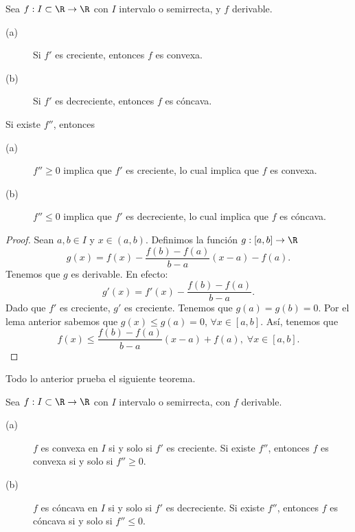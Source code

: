 \begin{fprop}[]
\normalfont Sea $\displaystyle f : I \subset \R \to \R $ con $\displaystyle I $ intervalo o semirrecta, y $\displaystyle f $ derivable. 
\begin{description}
\item[(a)] Si $\displaystyle f' $ es creciente, entonces $\displaystyle f $ es convexa.
\item[(b)] Si $\displaystyle f' $ es decreciente, entonces $\displaystyle f $ es cóncava.
\end{description}
\end{fprop}
\begin{observation}
\normalfont Si existe $\displaystyle f'' $, entonces 
\begin{description}
\item[(a)] $\displaystyle f'' \geq 0  $ implica que $\displaystyle f' $ es creciente, lo cual implica que $\displaystyle f $ es convexa.
\item[(b)] $\displaystyle f'' \leq 0 $ implica que $\displaystyle f' $ es decreciente, lo cual implica que $\displaystyle f $ es cóncava.
\end{description}
\end{observation}
\begin{proof}
	Sean $\displaystyle a,b \in I $ y $\displaystyle x \in \left(a,b\right) $. Definimos la función $\displaystyle g : [a,b] \to \R $  
\[ g\left(x\right) = f\left(x\right)-\frac{f\left(b\right)-f\left(a\right)}{b-a}\left(x-a\right)-f\left(a\right) .\]
Tenemos que $\displaystyle g $ es derivable. En efecto:
\[g'\left(x\right) = f'\left(x\right)-\frac{f\left(b\right)-f\left(a\right)}{b-a} .\]
Dado que $\displaystyle f' $ es creciente, $\displaystyle g' $ es creciente. Tenemos que $\displaystyle g\left(a\right) = g\left(b\right) = 0 $. Por el lema anterior sabemos que $\displaystyle g\left(x\right) \leq g\left(a\right) = 0 $, $\displaystyle \forall x \in \left[a,b\right] $. Así, tenemos que 
\[ f\left(x\right) \leq \frac{f\left(b\right)-f\left(a\right)}{b-a}\left(x-a\right) + f\left(a\right), \; \forall x \in [a,b] .\]
\end{proof}
Todo lo anterior prueba el siguiente teorema.
\begin{ftheorem}[]
\normalfont Sea $\displaystyle f: I \subset \R \to \R  $ con $\displaystyle I $ intervalo o semirrecta, con $\displaystyle f $ derivable.
\begin{description}
\item[(a)] $\displaystyle f $ es convexa en $\displaystyle I $ si y solo si $\displaystyle f' $ es creciente. Si existe $\displaystyle f'' $, entonces $\displaystyle f $ es convexa si y solo si $\displaystyle f'' \geq 0 $.
\item[(b)] $\displaystyle f $ es cóncava en $\displaystyle I $ si y solo si $\displaystyle f' $ es decreciente. Si existe $\displaystyle f'' $, entonces $\displaystyle f $ es cóncava si y solo si $\displaystyle f'' \leq 0 $.
\end{description}
\end{ftheorem}

